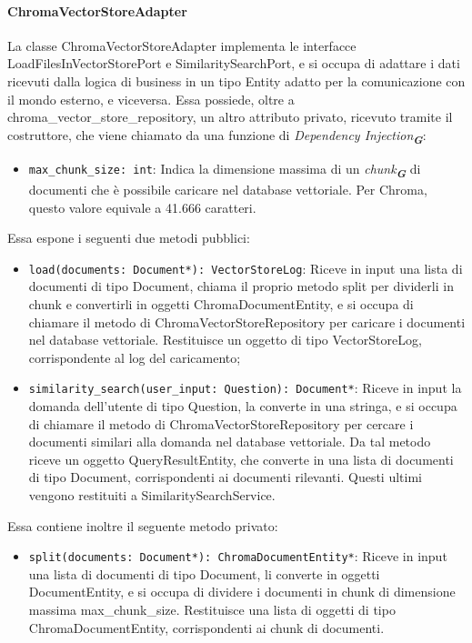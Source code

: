 \paragraph{ChromaVectorStoreAdapter}
\label{sec:chroma_vector_store_adapter}
La classe ChromaVectorStoreAdapter implementa le interfacce LoadFilesInVectorStorePort e SimilaritySearchPort, e si occupa di adattare i dati ricevuti dalla logica di business in un tipo Entity adatto per la comunicazione con il mondo esterno, e viceversa. 
Essa possiede, oltre a chroma\_vector\_store\_repository, un altro attributo privato, ricevuto tramite il costruttore, che viene chiamato da una funzione di \emph{Dependency Injection}\textsubscript{\textbf{\textit{G}}}:
\begin{itemize}
    \item \texttt{max\_chunk\_size: int}: Indica la dimensione massima di un \emph{chunk}\textsubscript{\textbf{\textit{G}}} di documenti che è possibile caricare nel database vettoriale. Per Chroma, questo valore equivale a 41.666 caratteri.
\end{itemize}
Essa espone i seguenti due metodi pubblici:
\begin{itemize}
    \item \texttt{load(documents: Document*): VectorStoreLog}: Riceve in input una lista di documenti di tipo Document, chiama il proprio metodo split per dividerli in chunk e convertirli in oggetti ChromaDocumentEntity, e si occupa di chiamare il metodo di ChromaVectorStoreRepository per caricare i documenti nel database vettoriale. Restituisce un oggetto di tipo VectorStoreLog, corrispondente al log del caricamento;
    \item \texttt{similarity\_search(user\_input: Question): Document*}: Riceve in input la domanda dell'utente di tipo Question, la converte in una stringa, e si occupa di chiamare il metodo di ChromaVectorStoreRepository per cercare i documenti similari alla domanda nel database vettoriale. Da tal metodo riceve un oggetto QueryResultEntity, che converte in una lista di documenti di tipo Document, corrispondenti ai documenti rilevanti. Questi ultimi vengono restituiti a SimilaritySearchService.
\end{itemize}
Essa contiene inoltre il seguente metodo privato:
\begin{itemize}
    \item \texttt{split(documents: Document*): ChromaDocumentEntity*}: Riceve in input una lista di documenti di tipo Document, li converte in oggetti DocumentEntity, e si occupa di dividere i documenti in chunk di dimensione massima max\_chunk\_size. Restituisce una lista di oggetti di tipo ChromaDocumentEntity, corrispondenti ai chunk di documenti.
\end{itemize}


